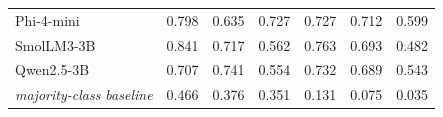 \begin{tabular}{@{}l*{14}{c}@{}}
Phi-4-mini & \multicolumn{3}{c}{0.798} & \multicolumn{3}{c}{0.635} & \multicolumn{2}{c}{0.727} & \multicolumn{2}{c}{0.727} & \multicolumn{2}{c}{0.712} & \multicolumn{2}{c}{0.599} \\
SmolLM3-3B & \multicolumn{3}{c}{0.841} & \multicolumn{3}{c}{0.717} & \multicolumn{2}{c}{0.562} & \multicolumn{2}{c}{0.763} & \multicolumn{2}{c}{0.693} & \multicolumn{2}{c}{0.482} \\
Qwen2.5-3B & \multicolumn{3}{c}{0.707} & \multicolumn{3}{c}{0.741} & \multicolumn{2}{c}{0.554} & \multicolumn{2}{c}{0.732} & \multicolumn{2}{c}{0.689} & \multicolumn{2}{c}{0.543} \\
\midrule
\itshape majority-class baseline & \multicolumn{3}{c}{0.466} & \multicolumn{3}{c}{0.376} & \multicolumn{2}{c}{0.351} & \multicolumn{2}{c}{0.131} & \multicolumn{2}{c}{0.075} & \multicolumn{2}{c}{0.035} \\
\bottomrule
\end{tabular}
